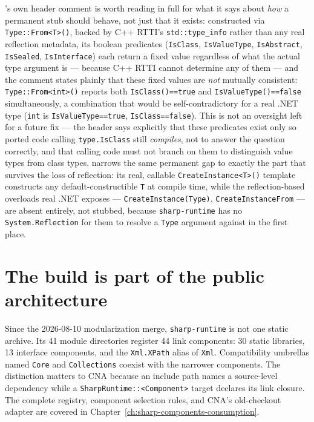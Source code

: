 's own header comment is worth reading in full for what it says about
\emph{how} a permanent stub should behave, not just that it exists: constructed via
\texttt{Type::From<T>()}, backed by C++ RTTI's \texttt{std::type\_info} rather than any real
reflection metadata, its boolean predicates (\texttt{IsClass}, \texttt{IsValueType},
\texttt{IsAbstract}, \texttt{IsSealed}, \texttt{IsInterface}) each return a fixed value
regardless of what the actual type argument is --- because C++ RTTI cannot determine any of
them --- and the comment states plainly that these fixed values are \emph{not} mutually
consistent: \texttt{Type::From<int>()} reports both \texttt{IsClass()==true} and
\texttt{IsValueType()==false} simultaneously, a combination that would be self-contradictory for
a real .NET type (\texttt{int} is \texttt{IsValueType==true}, \texttt{IsClass==false}). This is
not an oversight left for a future fix --- the header says explicitly that these predicates
exist only so ported code calling \texttt{type.IsClass} still \emph{compiles}, not to answer the
question correctly, and that calling code must not branch on them to distinguish value types
from class types.  narrows the same permanent gap to exactly the
part that survives the loss of reflection: its real, callable
\texttt{CreateInstance<T>()} template constructs any default-constructible \texttt{T} at
compile time, while the reflection-based overloads real .NET exposes ---
\texttt{CreateInstance(Type)}, \texttt{CreateInstanceFrom} --- are absent entirely, not stubbed,
because \texttt{sharp-runtime} has no \texttt{System.Reflection} for them to resolve a
\texttt{Type} argument against in the first place.

\section{The build is part of the public architecture}

Since the 2026-08-10 modularization merge, \texttt{sharp-runtime} is not one static archive.
Its 41 module directories register 44 link components: 30 static libraries, 13 interface
components, and the \texttt{Xml.XPath} alias of \texttt{Xml}. Compatibility umbrellas named
\texttt{Core} and \texttt{Collections} coexist with the narrower components. The distinction
matters to CNA because an include path names a source-level dependency while a
\texttt{SharpRuntime::<Component>} target declares its link closure. The complete registry,
component selection rules, and CNA's old-checkout adapter are covered in
Chapter~\ref{ch:sharp-components-consumption}.

